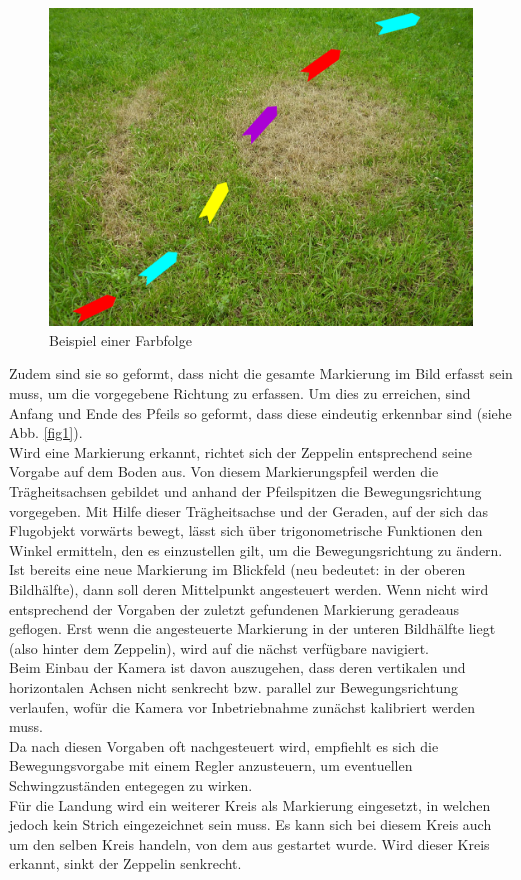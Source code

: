 \documentclass{ezb}
\begin{document}
\begin{figure}[h]
	\centering
  \includegraphics[scale=0.5]{richtungspfeileAufWieseBunt.png}
	\caption{Beispiel einer Farbfolge}
	\label{fig:farbfolge}
\end{figure}
\linebreak
Zudem sind sie so geformt, dass nicht die gesamte Markierung im Bild erfasst sein muss, um die vorgegebene Richtung zu erfassen. Um dies zu erreichen, sind Anfang und Ende des Pfeils so geformt, dass diese eindeutig erkennbar sind (siehe Abb. \ref{fig1}).\\ 
\linebreak
Wird eine Markierung erkannt, richtet sich der Zeppelin entsprechend seine Vorgabe auf dem Boden aus. Von diesem Markierungspfeil werden die Trägheitsachsen gebildet und anhand der Pfeilspitzen die Bewegungsrichtung vorgegeben. Mit Hilfe dieser Trägheitsachse und der Geraden, auf der sich das Flugobjekt vorwärts bewegt, lässt sich über trigonometrische Funktionen den Winkel ermitteln, den es einzustellen gilt, um die Bewegungsrichtung zu ändern. Ist bereits eine neue Markierung im Blickfeld (neu bedeutet: in der oberen Bildhälfte), dann soll deren Mittelpunkt angesteuert werden. Wenn nicht wird entsprechend der Vorgaben der zuletzt gefundenen Markierung geradeaus geflogen. Erst wenn die angesteuerte Markierung in der unteren Bildhälfte liegt (also hinter dem Zeppelin), wird auf die nächst verfügbare navigiert.\\
\linebreak 
Beim Einbau der Kamera ist davon auszugehen, dass deren vertikalen und horizontalen Achsen nicht senkrecht bzw. parallel zur Bewegungsrichtung verlaufen, wofür die Kamera vor Inbetriebnahme zunächst kalibriert werden muss.\\
\linebreak
Da nach diesen Vorgaben oft nachgesteuert wird, empfiehlt es sich die Bewegungsvorgabe mit einem Regler anzusteuern, um eventuellen Schwingzuständen entegegen zu wirken.\\ 
\linebreak
Für die Landung wird ein weiterer Kreis als Markierung eingesetzt, in welchen jedoch kein Strich eingezeichnet sein muss. Es kann sich bei diesem Kreis auch um den selben Kreis handeln, von dem aus gestartet wurde. Wird dieser Kreis erkannt, sinkt der Zeppelin senkrecht.
\end{document}
